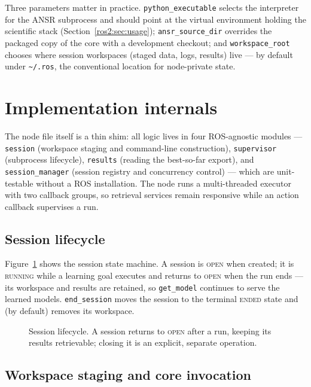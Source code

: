 Three parameters matter in practice. \texttt{python\_executable} selects the
interpreter for the ANSR subprocess and should point at the virtual
environment holding the scientific stack (Section~\ref{ros2:sec:usage});
\texttt{ansr\_source\_dir} overrides the packaged copy of the core with a
development checkout; and \texttt{workspace\_root} chooses where session
workspaces (staged data, logs, results) live --- by default under
\texttt{\textasciitilde/.ros}, the conventional location for node-private
state.

\section{Implementation internals}
\label{ros2:sec:internals}

The node file itself is a thin shim: all logic lives in four ROS-agnostic
modules --- \texttt{session} (workspace staging and command-line
construction), \texttt{supervisor} (subprocess lifecycle),
\texttt{results} (reading the best-so-far export), and
\texttt{session\_manager} (session registry and concurrency control) ---
which are unit-testable without a ROS installation. The node runs a
multi-threaded executor with two callback groups, so retrieval services
remain responsive while an action callback supervises a run.

\subsection{Session lifecycle}
\label{ros2:sec:lifecycle}

Figure~\ref{ros2:fig:lifecycle} shows the session state machine. A session is
\textsc{open} when created; it is \textsc{running} while a learning goal
executes and returns to \textsc{open} when the run ends --- its workspace and
results are retained, so \texttt{get\_model} continues to serve the learned
models. \texttt{end\_session} moves the session to the terminal
\textsc{ended} state and (by default) removes its workspace.

\begin{figure}[tb]
  \centering
  
  \caption{Session lifecycle. A session returns to \textsc{open} after a run,
    keeping its results retrievable; closing it is an explicit, separate
    operation.}
  \label{ros2:fig:lifecycle}
\end{figure}

\subsection{Workspace staging and core invocation}
\label{ros2:sec:staging}

